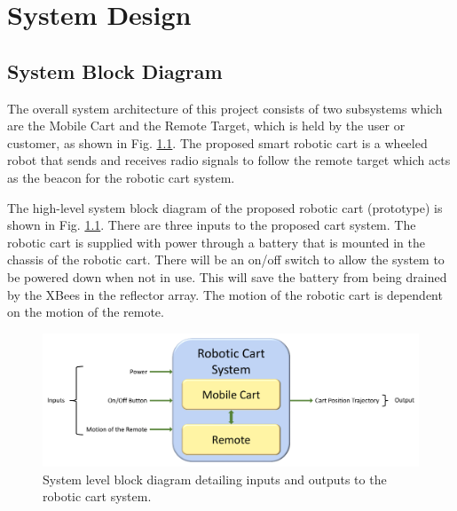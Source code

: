 \chapter{System Design}
\label{ch: sysDesign}

\section{System Block Diagram}
The overall system architecture of this project consists of two subsystems which
are the Mobile Cart and the Remote Target, which is held by the user or
customer, as shown in Fig. \ref{fig:sys_block_diag}. The proposed smart robotic
cart is a wheeled robot that sends and receives radio signals to follow the
remote target which acts as the beacon for the robotic cart system.

\vspace*{12pt}
\noindent
The high-level system block diagram of the proposed robotic cart (prototype) is shown in Fig. \ref{fig:sys_block_diag}. There are three inputs to the proposed cart system. The robotic cart is supplied with power through a battery that is mounted in the chassis of the robotic cart. There will be an on/off switch to allow the system to be powered down when not in use. This will save the battery from being drained by the XBees in the reflector array. The motion of the robotic cart is dependent on the motion of the remote.

\begin{figure}[H]
  \centering
  \includegraphics[width=\textwidth]{figs/systemBlockDiagram.pdf}
  \caption{System level block diagram detailing inputs and outputs to the
    robotic cart system.}
	\label{fig:sys_block_diag}
\end{figure}

